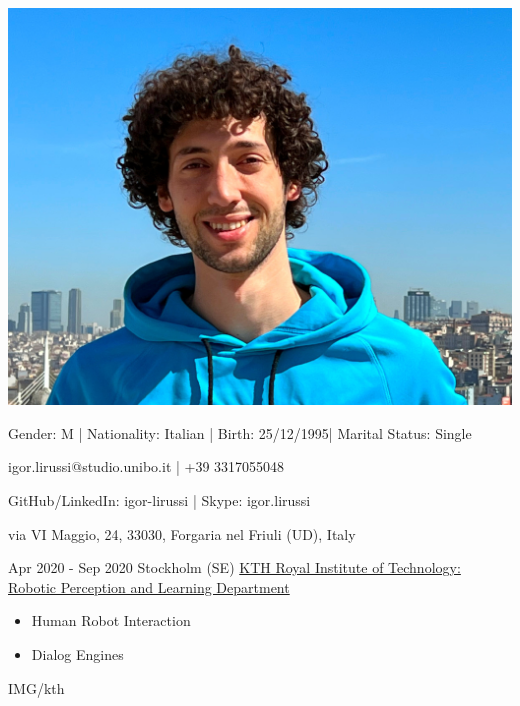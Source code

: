 \documentclass[paper=a4,fontsize=11pt, hidelinks]{temp} %
\begin{document}
\begin{minipage}{.2\linewidth}
   \includegraphics[width=1\textwidth]{photo}
\end{minipage}      
\begin{minipage}{0.7\linewidth}
   \sepspace
   \noindent
   \hfill Gender: M | Nationality: Italian | Birth: 25/12/1995| Marital Status: Single
   
   \hfill igor.lirussi@studio.unibo.it | +39 3317055048 
   
   \hfill GitHub/LinkedIn: igor-lirussi | Skype: igor.lirussi
   
   \hfill via VI Maggio, 24, 33030, Forgaria nel Friuli (UD), Italy
 
\end{minipage}


\noindent

{Apr 2020 - Sep 2020}
{Stockholm (SE) \href{https://www.kth.se/is/rpl}{KTH Royal Institute of Technology: Robotic Perception and Learning Department}}
{
 \begin{itemize}
    \item Human Robot Interaction
    \item Dialog Engines
 \end{itemize}
} {IMG/kth}

\sepspace
\end{document}
